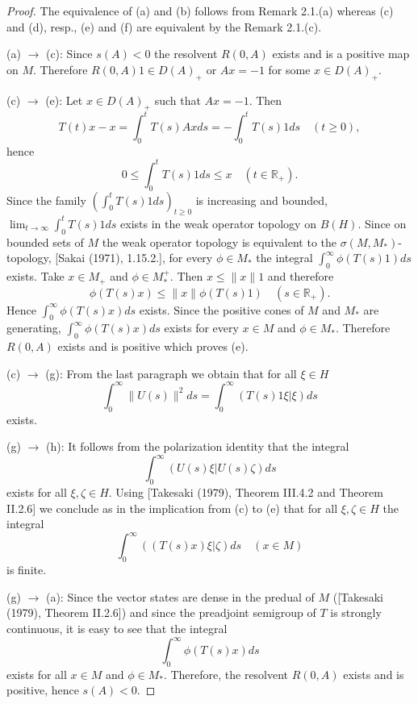 \begin{proof}
The equivalence of (a) and (b) follows from Remark 2.1.(a) whereas (c) and (d), resp., (e) and (f) are equivalent by the Remark 2.1.(c).

(a) $\to$ (c): Since $s(A) < 0$ the resolvent $R(0,A)$ exists and is a positive map on $M$.
Therefore $R(0,A)1 \in D(A)_{+}$ or $Ax = -1$ for some $x \in D(A)_{+}$.





\newpage


(c) $\to$ (e): Let $x \in D(A)_{+}$ such that $Ax = -1$.
Then
\[
T(t)x - x = \int_{0}^{t} T(s)Axds = -\int_{0}^{t} T(s)1ds \quad (t \geq 0),
\]
hence
\[
0 \leq \int_{0}^{t} T(s)1ds \leq x \quad (t \in \mathbb{R}_{+}).
\]
Since the family $(\int_{0}^{t} T(s)1ds)_{t \geq 0}$ is increasing and bounded, $\lim_{t \to \infty} \int_{0}^{t} T(s)1ds$ exists in the weak operator topology on $B(H)$.
Since on bounded sets of $M$ the weak operator topology is equivalent to the $\sigma(M,M_{*})$-topology, [Sakai (1971), 1.15.2.], for every $\phi \in M_{*}$ the integral $\int_{0}^{\infty}\phi(T(s)1)ds$ exists.
Take $x \in M_{+}$ and $\phi \in M_{*}^{+}$.
Then $x \leq \|x\|1$ and therefore
\[
\phi(T(s)x) \leq \|x\|\phi(T(s)1) \quad (s \in \mathbb{R}_{+}).
\]
Hence $\int_{0}^{\infty} \phi(T(s)x)ds$ exists.
Since the positive cones of $M$ and $M_{*}$ are generating, $\int_{0}^{\infty}\phi(T(s)x)ds$ exists for every $x \in M$ and $\phi \in M_{*}$.
Therefore $R(0,A)$ exists and is positive which proves (e).

(c) $\to$ (g): From the last paragraph we obtain that for all $\xi \in H$
\[
\int_{0}^{\infty}\|U(s)\|^2ds = \int_{0}^{\infty}(T(s)1\xi|\xi)ds
\]
exists.

(g) $\to$ (h): It follows from the polarization identity that the integral
\[
\int_{0}^{\infty}(U(s)\xi|U(s)\zeta)ds
\]
exists for all $\xi,\zeta \in H$.
Using [Takesaki (1979), Theorem III.4.2 and Theorem II.2.6] we conclude as in the implication from (c) to (e) that for all $\xi,\zeta \in H$ the integral
\[
\int_{0}^{\infty}((T(s)x)\xi|\zeta)ds \quad (x \in M)
\]
is finite.






\newpage



(g) $\to$ (a): Since the vector states are dense in the predual of $M$ ([Takesaki (1979), Theorem II.2.6]) and since the preadjoint semigroup of $T$ is strongly continuous, it is easy to see that the integral
\[
\int_{0}^{\infty} \phi(T(s)x)ds
\]
exists for all $x \in M$ and $\phi \in M_{*}$.
Therefore, the resolvent $R(0,A)$ exists and is positive, hence $s(A) < 0$.
\end{proof}

